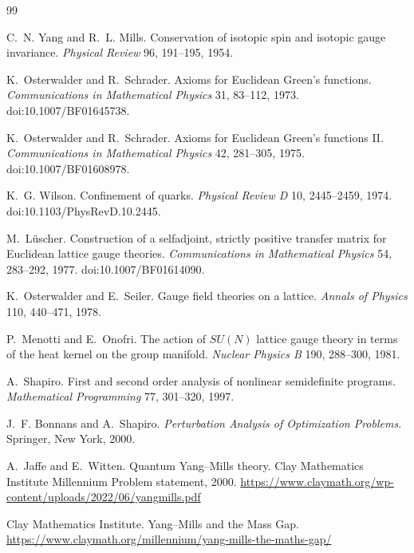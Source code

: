 \documentclass[11pt]{article}
\begin{document}
\begin{thebibliography}{99}

C.~N. Yang and R.~L. Mills.
\newblock Conservation of isotopic spin and isotopic gauge invariance.
\newblock \emph{Physical Review} 96, 191--195, 1954.

K.~Osterwalder and R.~Schrader.
\newblock Axioms for Euclidean Green's functions.
\newblock \emph{Communications in Mathematical Physics} 31, 83--112, 1973.
\newblock doi:10.1007/BF01645738.

K.~Osterwalder and R.~Schrader.
\newblock Axioms for Euclidean Green's functions II.
\newblock \emph{Communications in Mathematical Physics} 42, 281--305, 1975.
\newblock doi:10.1007/BF01608978.

K.~G. Wilson.
\newblock Confinement of quarks.
\newblock \emph{Physical Review D} 10, 2445--2459, 1974.
\newblock doi:10.1103/PhysRevD.10.2445.

M.~L\"uscher.
\newblock Construction of a selfadjoint, strictly positive transfer matrix for Euclidean lattice gauge theories.
\newblock \emph{Communications in Mathematical Physics} 54, 283--292, 1977.
\newblock doi:10.1007/BF01614090.

K.~Osterwalder and E.~Seiler.
\newblock Gauge field theories on a lattice.
\newblock \emph{Annals of Physics} 110, 440--471, 1978.

P.~Menotti and E.~Onofri.
\newblock The action of $SU(N)$ lattice gauge theory in terms of the heat kernel on the group manifold.
\newblock \emph{Nuclear Physics B} 190, 288--300, 1981.

A.~Shapiro.
\newblock First and second order analysis of nonlinear semidefinite programs.
\newblock \emph{Mathematical Programming} 77, 301--320, 1997.

J.~F. Bonnans and A.~Shapiro.
\newblock \emph{Perturbation Analysis of Optimization Problems}.
\newblock Springer, New York, 2000.

A.~Jaffe and E.~Witten.
\newblock Quantum Yang--Mills theory.
\newblock Clay Mathematics Institute Millennium Problem statement, 2000.
\newblock \url{https://www.claymath.org/wp-content/uploads/2022/06/yangmills.pdf}

Clay Mathematics Institute.
\newblock Yang--Mills and the Mass Gap.
\newblock \url{https://www.claymath.org/millennium/yang-mills-the-maths-gap/}

\end{thebibliography}
\end{document}
